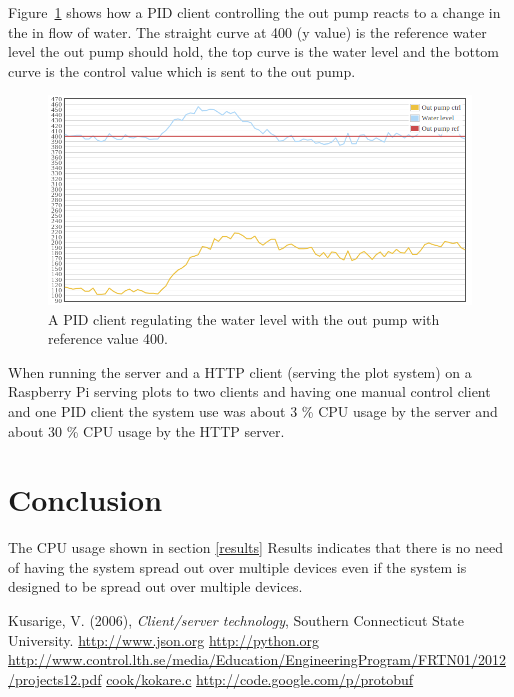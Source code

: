 \documentclass{article}
\begin{document}
Figure~\ref{fig:out pump} shows how a PID client controlling the out pump reacts
to a change in the in flow of water. The straight curve at 400 (y value) is the
reference water level the out pump should hold, the top curve is the water level
and the bottom curve is the control value which is sent to the out pump.

\begin{figure}[H]
\includegraphics[width=1.0\textwidth]{plot1.png}
\caption{A PID client regulating the water level with the out pump with reference value 400.}
\label{fig:out pump}
\end{figure}

When running the server and a HTTP client (serving the plot system) on a
Raspberry Pi serving plots to two clients and having one manual control client
and one PID client the system use was about 3 \% CPU usage by the server and 
about 30 \% CPU usage by the HTTP server.

\section{Conclusion}
The CPU usage shown in section \ref{results} Results indicates that there is no need of having the system spread out over multiple devices even if the system is designed to be spread out over multiple devices.

\newpage

\begin{thebibliography}{9}
Kusarige, V. (2006), \emph{Client/server technology}, Southern Connecticut State University.
\url{http://www.json.org}
\url{http://python.org}
\url{http://www.control.lth.se/media/Education/EngineeringProgram/FRTN01/2012/projects12.pdf}
\url{cook/kokare.c}
\url{http://code.google.com/p/protobuf}
\end{thebibliography}
\end{document}
